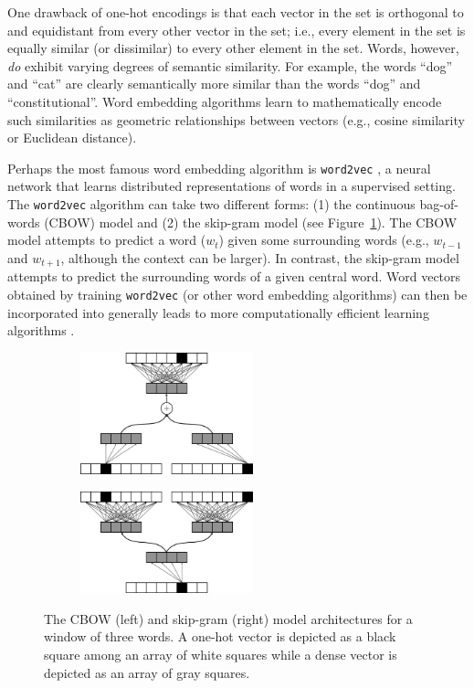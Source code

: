 \documentclass{article}
\begin{document}
One drawback of one-hot encodings is that each vector in the set is orthogonal to and equidistant from every other vector in the set; i.e., every element in the set is equally similar (or dissimilar) to every other element in the set. Words, however, \emph{do} exhibit varying degrees of semantic similarity. For example, the words ``dog'' and ``cat'' are clearly semantically more similar than the words ``dog'' and ``constitutional''. Word embedding algorithms learn to mathematically encode such similarities as geometric relationships between vectors (e.g., cosine similarity or Euclidean distance).

Perhaps the most famous word embedding algorithm is \texttt{word2vec} \parencite{Mikolov2013}, a neural network that learns distributed representations of words in a supervised setting. The \texttt{word2vec} algorithm can take two different forms: (1) the continuous bag-of-words (CBOW) model and (2) the skip-gram model (see Figure~\ref{fig:word2vec}). The CBOW model attempts to predict a word ($w_t$) given some surrounding words (e.g., $w_{t-1}$ and $w_{t+1}$, although the context can be larger). In contrast, the skip-gram model attempts to predict the surrounding words of a given central word. Word vectors obtained by training \texttt{word2vec} (or other word embedding algorithms) can then be incorporated into generally leads to more computationally efficient learning algorithms \parencite{Bengio2003}.

\begin{figure}[h]
\captionsetup[subfigure]{labelformat=empty}
\centering

    \begin{subfigure}[t]{0.45\textwidth}
    \centering
    \includegraphics[width=5cm]{cbow_fig.png}
    \caption{}
    \end{subfigure}%
    \begin{subfigure}[t]{0.45\textwidth}
    \centering
    \includegraphics[width=5cm]{skip_gram.png}
    \caption{}
    \end{subfigure}

\caption{The CBOW (left) and skip-gram (right) model architectures for a window of three words. A one-hot vector is depicted as a black square among an array of white squares while a dense vector is depicted as an array of gray squares.}
\label{fig:word2vec}
\end{figure}
\end{document}
